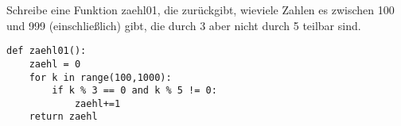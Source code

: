 \question[4] Schreibe eine Funktion zaehl01, die zurückgibt, wieviele Zahlen
es zwischen 100 und 999 (einschließlich) gibt, die durch 3 aber nicht durch 5
teilbar sind.
\begin{solutionbox}{4cm}
\begin{lstlisting}
def zaehl01():
    zaehl = 0
    for k in range(100,1000):
        if k % 3 == 0 and k % 5 != 0:
            zaehl+=1
    return zaehl
\end{lstlisting}
\end{solutionbox}

